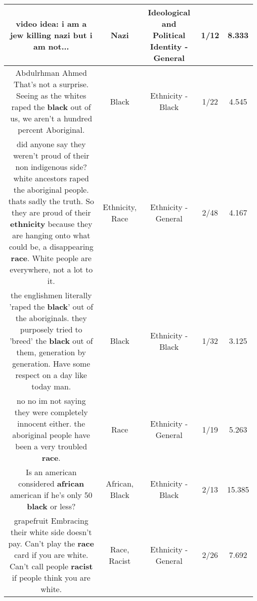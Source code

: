 \documentclass[11pt]{article}
\newlength\mylength
\begin{document}
\begin{center}
\begin{longtable}{|C{.65\mylength}|C{.30\mylength}|C{.12\mylength}|C{.12\mylength}|C{.12\mylength}|}
  \small video idea: i am a jew killing \textbf{nazi} but i am not...\normalsize   & Nazi &  Ideological and Political Identity - General & 1/12 & 8.333 \\  \hline
  \small Abdulrhman Ahmed That's not a surprise. Seeing as the whites raped the \textbf{black} out of us, we aren't a hundred percent Aboriginal.\normalsize   & Black & Ethnicity - Black & 1/22 & 4.545 \\  \hline
  \small did anyone say they weren't proud of their non indigenous side? white ancestors raped the aboriginal people. thats sadly the truth. So they are proud of their \textbf{ethnicity} because they are hanging onto what could be, a disappearing \textbf{race}. White people are everywhere, not a lot to it.\normalsize   & Ethnicity, Race & Ethnicity - General & 2/48 & 4.167 \\  \hline
  \small the englishmen literally 'raped the \textbf{black}' out of the aboriginals. they purposely tried to 'breed' the \textbf{black} out of them, generation by generation. Have some respect on a day like today man.\normalsize   & Black & Ethnicity - Black & 1/32 & 3.125 \\  \hline
  \small no no im not saying they were completely innocent either. the aboriginal people have been a very troubled \textbf{race}.\normalsize   & Race & Ethnicity - General & 1/19 & 5.263 \\  \hline
  \small Is an american considered \textbf{african} american if he's only 50 \textbf{black} or less?\normalsize   & African, Black & Ethnicity - Black & 2/13 & 15.385 \\  \hline
  \small grapefruit Embracing their white side doesn't pay. Can't play the \textbf{race} card if you are white. Can't call people \textbf{racist} if people think you are white.\normalsize   & Race, Racist & Ethnicity - General & 2/26 & 7.692 \\  \hline

\end{longtable}
\end{center}
\end{document}
